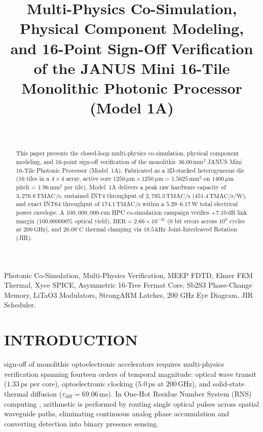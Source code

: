 \documentclass[journal]{IEEEtran}
\title{
Multi-Physics Co-Simulation, Physical Component Modeling, and 16-Point Sign-Off Verification of the JANUS Mini 16-Tile Monolithic Photonic Processor (Model 1A)
}
\author{
\IEEEauthorblockN{Deepanshu Bhardwaj}\\[2pt]
\IEEEauthorblockA{\small Patent Application No.: 202611052791 (Patent Pending)}
}
\begin{document}
\maketitle

\begin{abstract}
This paper presents the closed-loop multi-physics co-simulation, physical component modeling, and 16-point sign-off verification of the monolithic $36.00\,\mathrm{mm^2}$ JANUS Mini 16-Tile Photonic Processor (Model~1A). Fabricated as a 3D-stacked heterogeneous die ($16$ tiles in a $4 \times 4$ array, active core $1250\,\mu\mathrm{m} \times 1250\,\mu\mathrm{m} = 1.5625\,\mathrm{mm^2}$ on $1400\,\mu\mathrm{m}$ pitch = $1.96\,\mathrm{mm^2}$ per tile), Model~1A delivers a peak raw hardware capacity of $3,276.8\,\mathrm{TMAC/s}$, sustained INT4 throughput of $2,785.3\,\mathrm{TMAC/s}$ ($451.4\,\mathrm{TMAC/s/W}$), and exact INT64 throughput of $174.1\,\mathrm{TMAC/s}$ within a $5.29\text{--}6.17\,\mathrm{W}$ total electrical power envelope. A $100,000,000$-run HPC co-simulation campaign verifies $+7.10\,\mathrm{dB}$ link margin ($100.000000\%$ optical yield), $\mathrm{BER} = 2.66 \times 10^{-41}$ ($0$ bit errors across $10^8$ cycles at $200\,\mathrm{GHz}$), and $26.08^\circ\mathrm{C}$ thermal clamping via $18.5\,\mathrm{kHz}$ Joint-Interleaved Rotation (JIR).
\end{abstract}

\begin{IEEEkeywords}
Photonic Co-Simulation, Multi-Physics Verification, MEEP FDTD, Elmer FEM Thermal, Xyce SPICE, Asymmetric 16-Tree Fermat Core, Sb2S3 Phase-Change Memory, LiTaO3 Modulators, StrongARM Latches, 200 GHz Eye Diagram, JIR Scheduler.
\end{IEEEkeywords}

\section{INTRODUCTION}

 sign-off of monolithic optoelectronic accelerators requires multi-physics verification spanning fourteen orders of temporal magnitude: optical wave transit ($1.33\,\mathrm{ps}$ per core), optoelectronic clocking ($5.0\,\mathrm{ps}$ at $200\,\mathrm{GHz}$), and solid-state thermal diffusion ($\tau_{\mathrm{diff}} = 69.06\,\mathrm{ms}$). In One-Hot Residue Number System (RNS) computing \cite{Bhardwaj2026JANUS}\cite{Huang1979}\cite{Omosanya2021}, arithmetic is performed by routing single optical pulses across spatial waveguide paths, eliminating continuous analog phase accumulation and converting detection into binary presence sensing.
\end{document}
